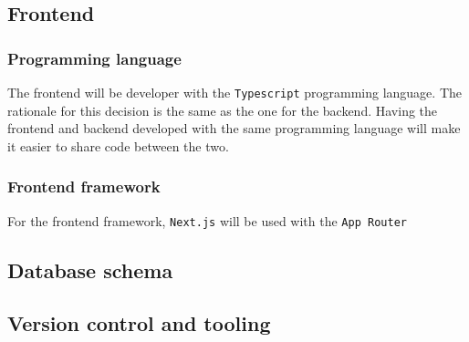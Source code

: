 \documentclass[../main.tex]{subfiles}
\begin{document}

\subsection{Frontend}

\subsubsection{Programming language}

The frontend will be developer with the \texttt{Typescript} programming language.
The rationale for this decision is the same as the one for the backend.
Having the frontend and backend developed with the same programming language will make it easier to share code between the two.

\subsubsection{Frontend framework}

For the frontend framework, \texttt{Next.js} \cite{nextjs} will be used with the \texttt{App Router}


\subsection{Database schema}


\subsection{Version control and tooling}
\end{document}
